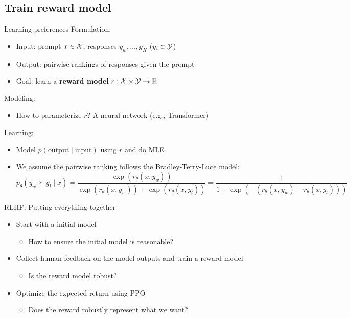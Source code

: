 \documentclass[usenames,dvipsnames,notes,11pt,aspectratio=169,hyperref={colorlinks=true, linkcolor=blue}]{beamer}
\begin{document}
\subsection{Train reward model}
\begin{frame}
    {Learning preferences}
    Formulation:\\
    \begin{itemize}
        \item Input: prompt $x\in\mathcal{X}$, responses $y_w,\ldots, y_K$ ($y_i\in\mathcal{Y}$)
        \item Output: pairwise rankings of responses given the prompt
        \item Goal: learn a {\bf reward model} $r: \mathcal{X} \times \mathcal{Y} \rightarrow \mathbb{R}$
    \end{itemize}

    \pause
    Modeling:\\
    \begin{itemize}
        \item How to parameterize $r$? A neural network (e.g., Transformer)
    \end{itemize}

    \pause
    Learning:\\
    \begin{itemize}
        \item Model $p(\text{output}\mid \text{input})$ using $r$ and do MLE
        \item We assume the pairwise ranking follows the Bradley-Terry-Luce model:
            $$
            p_\theta(y_w \succ y_l \mid x) = \frac{\exp(r_\theta(x,y_w))}
            {\exp(r_\theta(x,y_w)) + \exp(r_\theta(x,y_l))}
            = \frac{1}{1+\exp(-(r_\theta(x,y_w) - r_\theta(x,y_l)))}
            $$
    \end{itemize}
\end{frame}

\begin{frame}{RLHF: Putting everything together}
    \begin{itemize}
        \itemsep1em
        \item Start with a initial model 
            \begin{itemize}[<2->]
                \item How to ensure the initial model is reasonable?
            \end{itemize}
        \item Collect human feedback on the model outputs and train a reward model
            \begin{itemize}[<2->]
                \item Is the reward model robust? 
            \end{itemize}
        \item Optimize the expected return using PPO 
            \begin{itemize}[<2->]
                \item Does the reward robustly represent what we want? 
            \end{itemize}
    \end{itemize}
\end{frame}
\end{document}
